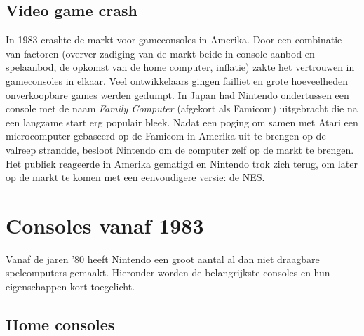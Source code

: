 \documentclass{article}
\begin{document}
\subsection{Video game crash}
In 1983 crashte de markt voor gameconsoles in Amerika. Door een combinatie van factoren (overver-zadiging van de markt beide in console-aanbod en spelaanbod, de opkomst van de home computer, inflatie) zakte het vertrouwen in gameconsoles in elkaar.
Veel ontwikkelaars gingen failliet en grote hoeveelheden onverkoopbare games werden gedumpt. In Japan had Nintendo ondertussen een console met de naam \textit{Family Computer} (afgekort als Famicom) uitgebracht die na een langzame start erg populair bleek. Nadat een poging om samen met Atari een microcomputer gebaseerd op de Famicom in Amerika uit te brengen op de valreep strandde, besloot Nintendo om de computer zelf op de markt te brengen. Het publiek reageerde in Amerika gematigd en Nintendo trok zich terug, om later op de markt te komen met een eenvoudigere versie: de NES. 

\section{Consoles vanaf 1983}
Vanaf de jaren '80 heeft Nintendo een groot aantal al dan niet draagbare spelcomputers gemaakt. Hieronder worden de belangrijkste consoles en hun eigenschappen kort toegelicht. 
\subsection{Home consoles}
\end{document}

